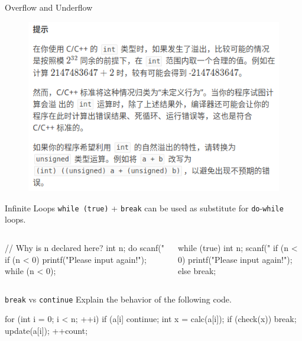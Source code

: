 \documentclass[handout]{beamer}
\newcommand{\ttt}[1]{\texttt{#1}}
\begin{document}
\begin{frame}{Overflow and Underflow}
    \begin{figure}[h]
        \centering
        \includegraphics[scale = 0.5]{figures/from-luogu.png}
    \end{figure}
\end{frame}

\begin{frame}[fragile]{Infinite Loops}
    \ttt{while (true)} + \ttt{break} can be used as substitute for \ttt{do}-\ttt{while} loops.
    \begin{columns}
        \begin{cpp}
// Why is n declared here?
int n;
do {
  scanf("%
  if (n < 0)
    printf("Please input again!\n");
} while (n < 0);
        \end{cpp}
        \begin{cpp}
while (true) {
  int n;
  scanf("%
  if (n < 0)
    printf("Please input again!\n");
  else
    break;
}
        \end{cpp}
    \end{columns}
\end{frame}

\begin{frame}[fragile]{\ttt{break} vs \ttt{continue}}
    Explain the behavior of the following code.
    \begin{cpp}
for (int i = 0; i < n; ++i) {
  if (a[i] %
    continue;
  int x = calc(a[i]);
  if (check(x))
    break;
  update(a[i]);
  ++count;
}
    \end{cpp}
\end{frame}
\end{document}
